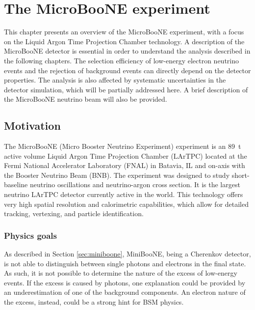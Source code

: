 \chapter{\label{ch:4-microboone}The MicroBooNE experiment}

\minitoc


This chapter presents an overview of the MicroBooNE experiment, with a focus on the Liquid Argon Time Projection Chamber technology. A description of the MicroBooNE detector is essential in order to understand the analysis described in the following chapters. The selection efficiency of low-energy electron neutrino events and the rejection of background events can directly depend on the detector properties. The analysis is also affected by systematic uncertainties in the detector simulation, which will be partially addressed here. A brief description of the MicroBooNE neutrino beam will also be provided.

\section{Motivation}
The MicroBooNE (Micro Booster Neutrino Experiment) experiment is an 89~t active volume Liquid Argon Time Projection Chamber (LArTPC) located at the Fermi National Accelerator Laboratory (FNAL) in Batavia, IL and on-axis with the Booster Neutrino Beam (BNB). The experiment was designed to study short-baseline neutrino oscillations and neutrino-argon cross section. It is the largest neutrino LArTPC detector currently active in the world.
This technology offers very high spatial resolution and calorimetric capabilities, which allow for detailed tracking, vertexing, and particle identification. 

\subsection{Physics goals}
As described in Section \ref{sec:miniboone}, MiniBooNE, being a Cherenkov detector, is not able to distinguish between single photons and electrons in the final state. As such, it is not possible to determine the nature of the excess of low-energy events. If the excess is caused by photons, one explanation could be provided by an underestimation of one of the background components. An electron nature of the excess, instead, could be a strong hint for BSM physics.

